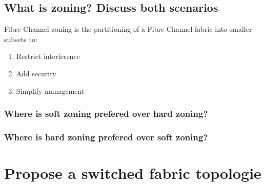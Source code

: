 \documentclass{article}
\begin{document}
\subsection{ What is zoning? Discuss both scenarios}
	Fibre Channel zoning is the partitioning of a Fibre Channel fabric into smaller subsets to: \\
	\begin{enumerate}
		\item Restrict interference
		\item Add security  
		\item Simplify management
	\end{enumerate}

	\subsubsection{ Where is soft zoning prefered over hard zoning?}

	\subsubsection{ Where is hard zoning prefered over soft zoning?}
		
\section{Propose a switched fabric topologie}
\end{document}
